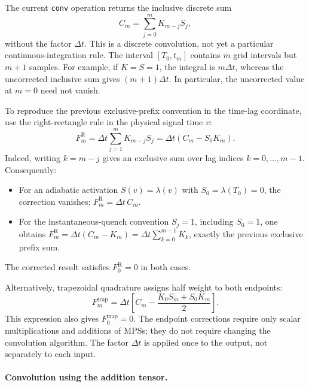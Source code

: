 \documentclass{article}
\begin{document}
The current \texttt{conv} operation returns the inclusive discrete sum
\begin{equation}
    C_m=\sum_{j=0}^{m}K_{m-j}S_j,
\end{equation}
without the factor $\Delta t$. This is a discrete convolution, not yet a
particular continuous-integration rule. The interval $[T_0,t_m]$ contains
$m$ grid intervals but $m+1$ samples. For example, if $K=S=1$, the integral
is $m\Delta t$, whereas the uncorrected inclusive sum gives $(m+1)\Delta t$.
In particular, the uncorrected value at $m=0$ need not vanish.

To reproduce the previous exclusive-prefix convention in the time-lag
coordinate, use the right-rectangle rule in the physical signal time $v$:
\begin{equation}
    \boxed{
    F_m^{\mathrm{R}}=
    \Delta t\sum_{j=1}^{m}K_{m-j}S_j
    =\Delta t\left(C_m-S_0K_m\right).
    }
    \label{eq:convolution_right_rectangle}
\end{equation}
Indeed, writing $k=m-j$ gives an exclusive sum over lag indices
$k=0,\ldots,m-1$. Consequently:
\begin{itemize}
    \item For an adiabatic activation $S(v)=\lambda(v)$ with
    $S_0=\lambda(T_0)=0$, the correction vanishes:
    $F_m^{\mathrm{R}}=\Delta t\,C_m$.
    \item For the instantaneous-quench convention $S_j=1$, including
    $S_0=1$, one obtains
    $F_m^{\mathrm{R}}=\Delta t(C_m-K_m)
    =\Delta t\sum_{k=0}^{m-1}K_k$, exactly the previous exclusive prefix sum.
\end{itemize}
The corrected result satisfies $F_0^{\mathrm{R}}=0$ in both cases.

Alternatively, trapezoidal quadrature assigns half weight to both endpoints:
\begin{equation}
    \boxed{
    F_m^{\mathrm{trap}}=
    \Delta t\left[C_m-\frac{K_0S_m+S_0K_m}{2}\right].
    }
    \label{eq:convolution_trapezoidal}
\end{equation}
This expression also gives $F_0^{\mathrm{trap}}=0$. The endpoint corrections
require only scalar multiplications and additions of MPSs; they do not
require changing the convolution algorithm. The factor $\Delta t$ is applied
once to the output, not separately to each input.

\paragraph{Convolution using the addition tensor.}
\end{document}

